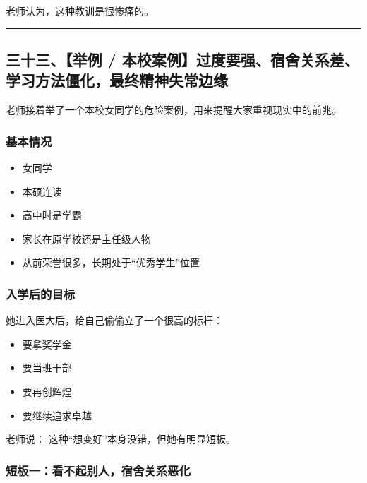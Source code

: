 \documentclass[
  chinese,
  9pt,
  a4paper,
]{ctexart}
\providecommand{\tightlist}{%
  \setlength{\itemsep}{0pt}\setlength{\parskip}{0pt}}
\begin{document}
老师认为，这种教训是很惨痛的。

\begin{center}\rule{0.5\linewidth}{0.5pt}\end{center}

\subsection{三十三、【举例 /
本校案例】过度要强、宿舍关系差、学习方法僵化，最终精神失常边缘}\label{ux4e09ux5341ux4e09ux4e3eux4f8b-ux672cux6821ux6848ux4f8bux8fc7ux5ea6ux8981ux5f3aux5bbfux820dux5173ux7cfbux5deeux5b66ux4e60ux65b9ux6cd5ux50f5ux5316ux6700ux7ec8ux7cbeux795eux5931ux5e38ux8fb9ux7f18}

老师接着举了一个本校女同学的危险案例，用来提醒大家重视现实中的前兆。

\subsubsection{基本情况}\label{ux57faux672cux60c5ux51b5-2}

\begin{itemize}
\tightlist
\item
  女同学
\item
  本硕连读
\item
  高中时是学霸
\item
  家长在原学校还是主任级人物
\item
  从前荣誉很多，长期处于``优秀学生''位置
\end{itemize}

\subsubsection{入学后的目标}\label{ux5165ux5b66ux540eux7684ux76eeux6807}

她进入医大后，给自己偷偷立了一个很高的标杆：

\begin{itemize}
\tightlist
\item
  要拿奖学金
\item
  要当班干部
\item
  要再创辉煌
\item
  要继续追求卓越
\end{itemize}

老师说： 这种``想变好''本身没错，但她有明显短板。

\subsubsection{短板一：看不起别人，宿舍关系恶化}\label{ux77edux677fux4e00ux770bux4e0dux8d77ux522bux4ebaux5bbfux820dux5173ux7cfbux6076ux5316}
\end{document}
